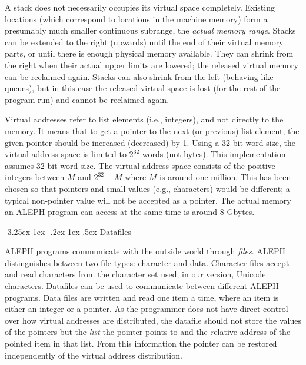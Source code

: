 \documentclass{article}
\makeatletter
\newcommand\A{{\sf ALEPH}}
\newcommand\g[1]{{\sf #1}}
\renewcommand\subsection{%
\@startsection{subsection}{2}{\z@}%
   {-3.25ex\@plus -1ex \@minus -.2ex}%
   {1ex \@plus .5ex}%
   {\normalfont\normalsize\bfseries}}
\makeatother
\begin{document}
A \g{stack} does not necessarily occupies its virtual space
completely.
Existing locations (which correspond to locations in the machine memory)
form a presumably much smaller continuous subrange, the \emph{actual memory
range}. \g{Stack}s can be extended to the right (upwards) until the end of
their virtual memory parts, or until there is enough physical memory available.
They can shrink from the right when their actual upper limits are lowered; the
released virtual memory can be reclaimed again. \g{Stack}s can also shrink
from the left (behaving like queues), but in this case the released virtual
space is lost (for the rest of the program run) and cannot be reclaimed
again.

Virtual addresses refer to list elements (i.e., integers), and not directly
to the memory. It means that to get a pointer to the next (or previous) list element,
the given pointer should be increased (decreased) by 1. Using
a 32-bit word size, the virtual address space is limited to $2^{32}$ words
(not bytes). This implementation assumes 32-bit word size. The
virtual address space consists of the positive integers between $M$ and
$2^{32}-M$ where $M$ is around one million. This has been chosen so that
pointers and small values (e.g., characters) would be different; a typical
non-pointer value will not be accepted as a pointer. The actual memory an
\A{} program can access at the same time is around 8 Gbytes.

\subsection{Datafiles}\label{subsec:datafile}

\A{} programs communicate with the outside world through \emph{files}. 
\A{} distinguishes between two file types: character and data. Character files 
accept and read
characters from the character set used; in our version, Unicode characters.
Datafiles can be used to communicate between different \A{} programs.
Data files are written and read one item a time, where an item is either an
integer or a pointer. As the programmer does not have direct control over
how virtual addresses are distributed, the datafile should not store the
values of the pointers but the \emph{list} the pointer points to and the {\emph 
relative address} of the pointed item in that list. From this information
the pointer can be restored independently of the virtual address
distribution.
\end{document}
